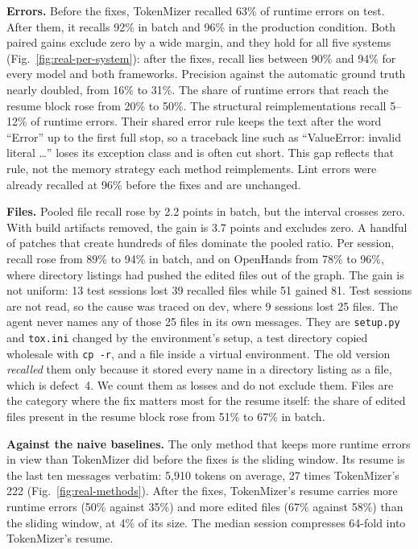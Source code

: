 \documentclass[journal]{IEEEtran}
\begin{document}
\textbf{Errors.} Before the fixes, TokenMizer recalled 63\% of
runtime errors on test. After them, it recalls 92\% in batch and
96\% in the production condition. Both paired gains exclude zero
by a wide margin, and they hold for all five systems
(Fig.~\ref{fig:real-per-system}): after the fixes, recall lies
between 90\% and 94\% for every model and both frameworks.
Precision against the automatic ground truth nearly doubled,
from 16\% to 31\%. The share of runtime errors that reach the
resume block rose from 20\% to 50\%.
The structural reimplementations recall 5--12\% of runtime
errors. Their shared error rule keeps the text after the word
``Error'' up to the first full stop, so a traceback line such as
``ValueError: invalid literal \ldots'' loses its exception class
and is often cut short. This gap reflects that rule, not the
memory strategy each method reimplements. Lint errors were already recalled at 96\% before the
fixes and are unchanged.

\textbf{Files.} Pooled file recall rose by 2.2 points in batch,
but the interval crosses zero. With build artifacts removed, the
gain is 3.7 points and excludes zero. A handful of patches that
create hundreds of files dominate the pooled ratio. Per session,
recall rose from 89\% to 94\% in batch, and on OpenHands from
78\% to 96\%, where directory listings had pushed the edited
files out of the graph. The gain is not uniform: 13 test sessions lost 39 recalled files while 51 gained 81. Test sessions are not read, so the cause was traced on dev, where 9 sessions lost 25 files. The agent never names any of those 25 files in its own messages. They are \texttt{setup.py} and \texttt{tox.ini} changed by the environment's setup, a test directory copied wholesale with \texttt{cp -r}, and a file inside a virtual environment. The old version \emph{recalled} them only because it stored every name in a directory listing as a file, which is defect~4. We count them as losses and do not exclude them.
Files are the category where the fix matters most for the resume
itself: the share of edited files present in the resume block
rose from 51\% to 67\% in batch.

\textbf{Against the naive baselines.} The only method that keeps
more runtime errors in view than TokenMizer did before the fixes
is the sliding window. Its resume is the last ten messages
verbatim: 5{,}910 tokens on average, 27 times TokenMizer's 222
(Fig.~\ref{fig:real-methods}). After the fixes, TokenMizer's
resume carries more runtime errors (50\% against 35\%) and more
edited files (67\% against 58\%) than the sliding window, at 4\%
of its size.
The median session compresses 64-fold into TokenMizer's resume.
\end{document}
